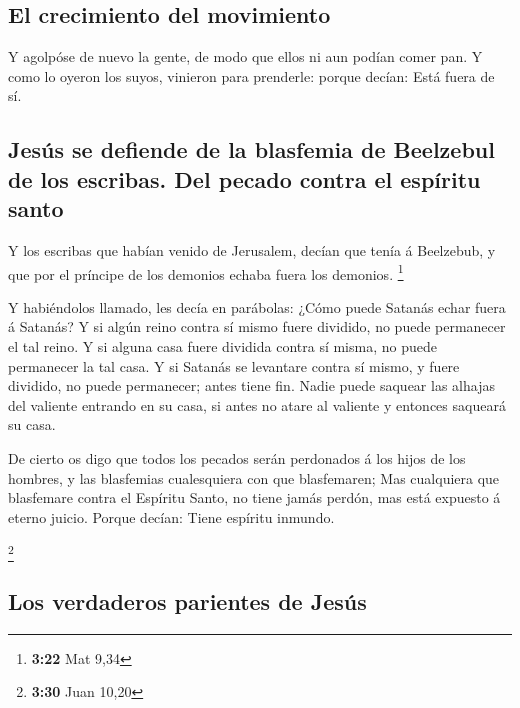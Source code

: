 \hypertarget{el-crecimiento-del-movimiento}{%
\subsection{El crecimiento del
movimiento}\label{el-crecimiento-del-movimiento}}

 Y agolpóse de nuevo la gente, de modo que ellos ni aun
podían comer pan.  Y como lo oyeron los suyos, vinieron
para prenderle: porque decían: Está fuera de sí.

\hypertarget{jesuxfas-se-defiende-de-la-blasfemia-de-beelzebul-de-los-escribas.-del-pecado-contra-el-espuxedritu-santo}{%
\subsection{Jesús se defiende de la blasfemia de Beelzebul de los
escribas. Del pecado contra el espíritu
santo}\label{jesuxfas-se-defiende-de-la-blasfemia-de-beelzebul-de-los-escribas.-del-pecado-contra-el-espuxedritu-santo}}

 Y los escribas que habían venido de Jerusalem, decían
que tenía á Beelzebub, y que por el príncipe de los demonios echaba
fuera los demonios. \footnote{\textbf{3:22} Mat 9,34}

 Y habiéndolos llamado, les decía en parábolas: ¿Cómo
puede Satanás echar fuera á Satanás?  Y si algún reino
contra sí mismo fuere dividido, no puede permanecer el tal reino.
 Y si alguna casa fuere dividida contra sí misma, no
puede permanecer la tal casa.  Y si Satanás se levantare
contra sí mismo, y fuere dividido, no puede permanecer; antes tiene fin.
 Nadie puede saquear las alhajas del valiente entrando en
su casa, si antes no atare al valiente y entonces saqueará su casa.

 De cierto os digo que todos los pecados serán perdonados
á los hijos de los hombres, y las blasfemias cualesquiera con que
blasfemaren;  Mas cualquiera que blasfemare contra el
Espíritu Santo, no tiene jamás perdón, mas está expuesto á eterno
juicio.  Porque decían: Tiene espíritu inmundo.

\footnote{\textbf{3:30} Juan 10,20}

\hypertarget{los-verdaderos-parientes-de-jesuxfas}{%
\subsection{Los verdaderos parientes de
Jesús}\label{los-verdaderos-parientes-de-jesuxfas}}

